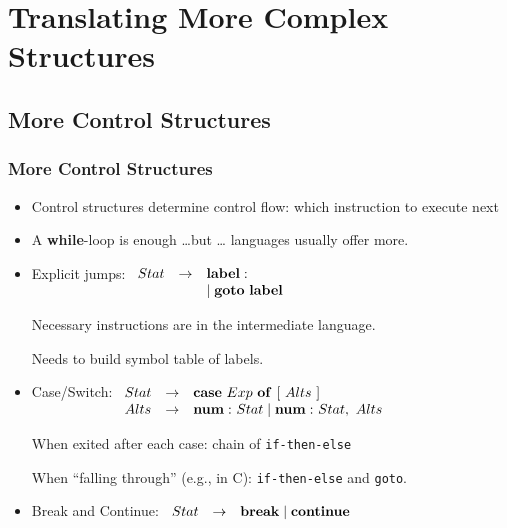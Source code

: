 \documentclass{beamer}
\newcommand{\codesize}{\footnotesize}
\newcommand{\cd}[1]{{{\codesize\tt #1}}}
\renewcommand{\emph}[1]{\textcolor{structure}{#1}}
\begin{document}
\section{Translating More Complex Structures}

\begin{frame}[fragile]
	\tableofcontents[currentsection]

\end{frame}


\subsection{More Control Structures}

\begin{frame}[fragile,t]
	\frametitle{More Control Structures}

\begin{itemize}
\item \emph{Control structures} determine \emph{control flow}: which instruction to execute next

\item A \textbf{while}-loop is enough
\pause \ldots but \ldots
languages usually offer more.

\item \emph{Explicit jumps}: 
{\footnotesize $ \begin{array}[t]{lll} 
Stat &\rightarrow &{\bf label:}\\
& &\mid {\bf goto}~{\bf label} 
\end{array}$
}

	Necessary instructions are in the intermediate language. 
	
	Needs to build symbol table of labels.

\pause
\item \emph{Case/Switch}:
{\footnotesize 
$ \begin{array}[t]{lll} 
Stat & \rightarrow &{\bf case}~Exp ~{\bf of}~[~Alts~]\\
Alts & \rightarrow & {\bf num:}~Stat \mid {\bf num:}~Stat ,~Alts
\end{array}$
}

	When exited after each case: chain of \cd{if-then-else}

	When ``falling through'' (e.g., in C): \cd{if-then-else} and \cd{goto}.
\pause
\item \emph{Break and Continue}:
{\footnotesize 
$ \begin{array}{lll} 
Stat & \rightarrow &{\bf break} \mid {\bf continue}
\end{array}$
}


\end{itemize}
\end{frame}
\end{document}
